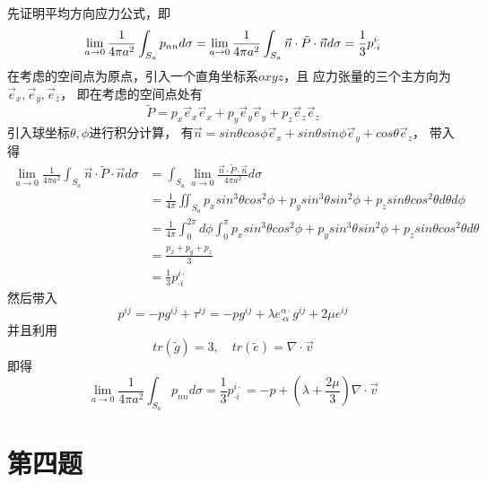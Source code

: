 \documentclass[UTF8]{ctexart}
\begin{document}
先证明平均方向应力公式，即
\begin{equation*}
    \lim_{a\to 0}\frac{1}{4\pi a^2}\int_{S_a} p_{nn} d\sigma
    =\lim_{a\to 0}\frac{1}{4\pi a^2}\int_{S_a} \vec n \cdot \tilde P \cdot \vec n d\sigma
    =\frac{1}{3}p^{i\cdot}_{\cdot i}
    \notag
\end{equation*}
在考虑的空间点为原点，引入一个直角坐标系$oxyz$，且
应力张量的三个主方向为$\vec e_x,\vec e_y,\vec e_z$，
即在考虑的空间点处有
\begin{equation*}
    \tilde P=p_x \vec e_x \vec e_x + p_y \vec e_y \vec e_y + p_z \vec e_z \vec e_z
\end{equation*}
引入球坐标$\theta,\phi$进行积分计算，
有$\vec n = sin\theta cos\phi \vec e_x+ sin\theta sin\phi \vec e_y +cos\theta \vec e_z$，
带入得
\begin{align*}
    \lim_{a\to 0}\frac{1}{4\pi a^2}\int_{S_a} \vec n \cdot \tilde P \cdot \vec n d\sigma
    &=\int_{S_a} \lim_{a\to 0}\frac{\vec n \cdot \tilde P \cdot \vec n}{4\pi a^2} d\sigma\\
    &=\frac{1}{4\pi } \iint_{S_a} p_x sin^3\theta cos^2\phi + p_y sin^3\theta sin^2\phi + p_z sin\theta cos^2\theta d\theta d\phi\\
    &=\frac{1}{4\pi } \int_{0}^{2\pi} d\phi \int_{0}^{\pi} p_x sin^3\theta cos^2\phi + p_y sin^3\theta sin^2\phi + p_z sin\theta cos^2\theta d\theta \\
    &=\frac{p_x+p_y+p_z}{3}\\
    &=\frac{1}{3}p^{i\cdot}_{\cdot i}
\end{align*}
然后带入
\begin{equation*}
    p^{ij}=-pg^{ij}+\tau ^{ij}
    =-pg^{ij}+\lambda e^{\alpha\cdot}_{\cdot \alpha} g^{ij} +2 \mu e^{ij}
\end{equation*}
并且利用
\begin{equation*}
    tr(\tilde g)=3,\quad tr(\tilde e)=\nabla \cdot \vec v
\end{equation*}
即得
\begin{equation*}
    \lim_{a\to 0}\frac{1}{4\pi a^2}\int_{S_a} p_{nn} d\sigma
    =\frac{1}{3}p^{i\cdot}_{\cdot i}=-p+(\lambda + \frac{2\mu}{3})\nabla \cdot \vec v
\end{equation*}

\section{第四题}
\end{document}
